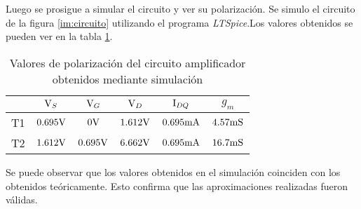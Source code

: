 Luego se prosigue a simular el circuito y ver su polarización. Se simulo el circuito de la figura \ref{im:circuito} utilizando el programa \textsl{LTSpice}.Los valores obtenidos se pueden ver en la tabla  \ref{ta:datosPolarizacion_sim}. 


\begin{table}[ht]
	\begin{center}
		\begin{tabular}{|c|c|c|c|c|c|}
		\hline 
		 & $\mbox{V}_{S}$ & $\mbox{V}_{G}$ & $\mbox{V}_{D}$ & $\mbox{I}_{DQ}$ & $g_m$ \\ 
		\hline 
		T1 & $0.695\mbox{V}$ & $0\mbox{V}$ & $1.612\mbox{V}$ & $0.695\mbox{mA}$ & $4.57\mbox{mS}$ \\ 
		\hline 
		T2 & $1.612\mbox{V}$ & $0.695\mbox{V}$ & $6.662\mbox{V}$ & $0.695\mbox{mA}$ & $16.7\mbox{mS}$ \\ 
		\hline 
		\end{tabular} 
	\end{center}
	\caption{Valores de polarización del circuito amplificador obtenidos mediante simulación}
	\label{ta:datosPolarizacion_sim}
\end{table}

Se puede observar que los valores obtenidos en el simulación coinciden con los obtenidos teóricamente. Esto confirma que las aproximaciones realizadas fueron válidas.

